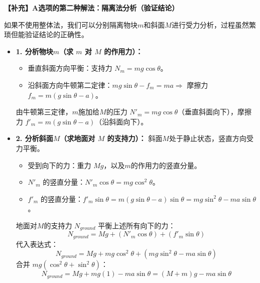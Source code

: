 \documentclass[CJKmath,a4paper,10pt]{exam-zh}
\begin{document}
\begin{center}
\end{center}

\vspace{0.5cm}
\textbf{【补充】A选项的第二种解法：隔离法分析（验证结论）}

如果不使用整体法，我们可以分别隔离物块$m$和斜面$M$进行受力分析，过程虽然繁琐但能验证结论的正确性。

\begin{itemize}
	\item \textbf{1. 分析物块$m$（求 $m$ 对 $M$ 的作用力）：}
	\begin{itemize}
		\item 垂直斜面方向平衡：支持力 $N_{m} = mg\cos\theta$。
		\item 沿斜面方向牛顿第二定律：$mg\sin\theta - f_{m} = ma \Rightarrow$ 摩擦力 $f_{m} = m(g\sin\theta - a)$。
	\end{itemize}
	由牛顿第三定律，$m$施加给$M$的压力 $N'_{m} = mg\cos\theta$（垂直斜面向下），摩擦力 $f'_{m} = m(g\sin\theta - a)$（沿斜面向下）。
	
	\item \textbf{2. 分析斜面$M$（求地面对 $M$ 的支持力）：}
	斜面$M$处于静止状态，竖直方向受力平衡。
	\begin{itemize}
		\item 受到向下的力：重力 $Mg$，以及$m$的作用力的竖直分量。
		\item $N'_{m}$ 的竖直分量：$N'_{m}\cos\theta = mg\cos^2\theta$。
		\item $f'_{m}$ 的竖直分量：$f'_{m}\sin\theta = m(g\sin\theta - a)\sin\theta = mg\sin^2\theta - ma\sin\theta$。
	\end{itemize}
	地面对$M$的支持力 $N_{ground}$ 平衡上述所有向下的力：
	\[ N_{ground} = Mg + (N'_{m}\cos\theta) + (f'_{m}\sin\theta) \]
	代入表达式：
	\[ N_{ground} = Mg + mg\cos^2\theta + (mg\sin^2\theta - ma\sin\theta) \]
	合并 $mg(\cos^2\theta + \sin^2\theta)$：
	\[ N_{ground} = Mg + mg(1) - ma\sin\theta = (M+m)g - ma\sin\theta \]
\end{itemize}
\end{document}
